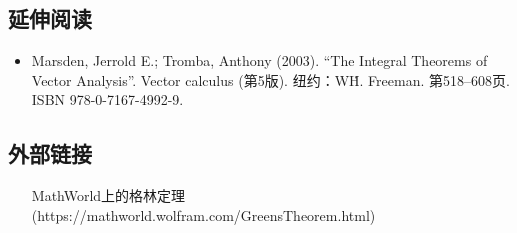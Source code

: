 \subsection{延伸阅读}
\begin{itemize}
\item Marsden, Jerrold E.; Tromba, Anthony (2003). “The Integral Theorems of Vector Analysis”. Vector calculus (第5版). 纽约：W\.H. Freeman. 第518–608页. ISBN 978-0-7167-4992-9.
\end{itemize}
\subsection{外部链接}
\begin{itemize}
\item [MathWorld上的格林定理](https://mathworld.wolfram.com/GreensTheorem.html)
\end{itemize}